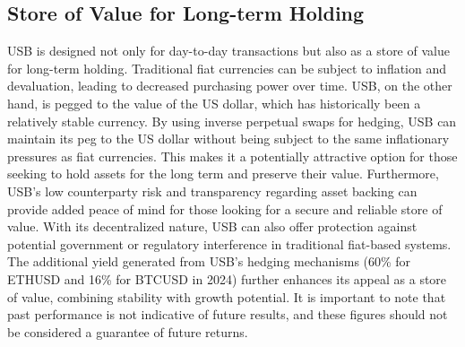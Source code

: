 \subsection{Store of Value for Long-term Holding}
USB is designed not only for day-to-day transactions but also as a store of value for long-term holding.
Traditional fiat currencies can be subject to inflation and devaluation, leading to decreased purchasing power over time. USB, on the other hand, is pegged to the value of the US dollar, which has historically been a relatively stable currency.\newline
By using inverse perpetual swaps for hedging, USB can maintain its peg to the US dollar without being subject to the same inflationary pressures as fiat currencies.
This makes it a potentially attractive option for those seeking to hold assets for the long term and preserve their value.\newline
Furthermore, USB's low counterparty risk and transparency regarding asset backing can provide added peace of mind for those looking for a secure and reliable store of value. 
With its decentralized nature, USB can also offer protection against potential government or regulatory interference in traditional fiat-based systems.
The additional yield generated from USB's hedging mechanisms (60\% for ETHUSD and 16\% for BTCUSD in 2024) further enhances its appeal as a store of value, combining stability with growth potential. It is important to note that past performance is not indicative of future results, and these figures should not be considered a guarantee of future returns. 

